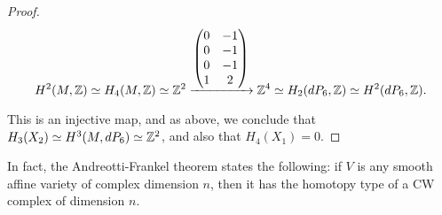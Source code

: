 \begin{proof}
\[
H^2(M,\mathbb{Z}) \simeq H_4(M,\mathbb{Z}) \simeq \mathbb{Z}^2 \xrightarrow{
	\begin{pmatrix}
	0 & -1 \\
	0 & -1 \\
	0 & -1  \\
	1 & 2 
	\end{pmatrix}
} \mathbb{Z}^4 \simeq H_2(dP_6,\mathbb{Z}) \simeq H^2(dP_6,\mathbb{Z}).
\]

This is an injective map, and as above, we conclude that $H_3(X_2) \simeq H^3(M,dP_6) \simeq \mathbb{Z}^2$, and also that $H_4(X_1)=0$.


\end{proof}

\begin{remark}
In fact, the Andreotti-Frankel theorem \cite{andreotti_affinecw} states the following: if $V$ is any smooth affine variety of complex dimension $n$, then it has the homotopy type of a CW complex of dimension $n$.
\end{remark}